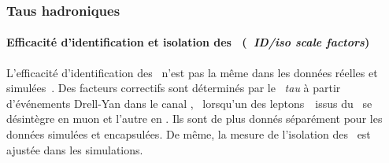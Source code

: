 \subsubsection{Taus hadroniques}
\paragraph{Efficacité d'identification et isolation des \tauh\ (\emph{\tauh\ ID/iso scale factors})}
L'efficacité d'identification des \tauh\ n'est pas la même dans les données réelles et simulées~\cite{TauPOG}.
Des facteurs correctifs sont déterminés par le \POG\ \emph{tau} à partir d'événements Drell-Yan dans le canal \mu\tauh, \ie\ lorsqu'un des leptons~\tau\ issus du \Zboson\ se désintègre en muon et l'autre en \tauh.
Ils sont de plus donnés séparément pour les données simulées et encapsulées.
De même, la mesure de l'isolation des \tauh\ est ajustée dans les simulations.
